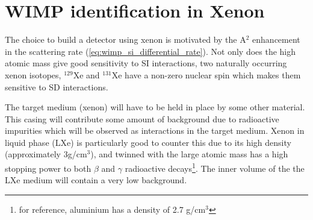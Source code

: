 \section{WIMP identification in Xenon}
\label{sec:wimps_with_xenon}

\par
The choice to build a detector using xenon is motivated by the A$^2$ enhancement in the scattering rate (\autoref{eq:wimp_si_differential_rate}).
Not only does the high atomic mass give good sensitivity to SI interactions, two naturally occurring xenon isotopes, ${}^{129}$Xe and ${}^{131}$Xe have a non-zero nuclear spin which makes them sensitive to SD interactions.
\par
The target medium (xenon) will have to be held in place by some other material.
This casing will contribute some amount of background due to radioactive impurities which will be observed as interactions in the target medium.
Xenon in liquid phase (LXe) is particularly good to counter this due to its high density (approximately 3g/cm${}^{3}$), and twinned with the large atomic mass has a high stopping power to both $\beta$ and $\gamma$ radioactive decays\footnote{for reference, aluminium has a density of 2.7 g/cm${}^{3}$}.
The inner volume of the the LXe medium will contain a very low background.



